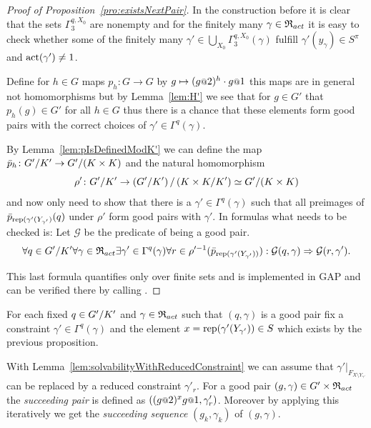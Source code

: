 \documentclass[a4paper,11pt]{amsart}
\begin{document}
\begin{proof}[Proof of Proposition~\ref{pro:existsNextPair}]
 In the construction before it is clear that the sets $\Gamma_3^{q,X_0}$ are nonempty and for the finitely many $\gamma\in \mathfrak{R}_{act}$ it is
 easy to check whether some of the finitely many $\gamma'\in\bigcup_{X_0}\Gamma_3^{q,X_0}(\gamma)$ fulfill $\gamma'(y_\gamma) \in S^\pi$ and $\operatorname{act}(\gamma')\neq 1$.
 
 
  Define for $h\in G$ maps $p_h\colon G\to G$ by $g\mapsto (g\at{2})^{h}\cdot g\at{1}$ this maps are in general not homomorphisms but 
  by Lemma~\ref{lem:H'} 
  we see that for $g\in G'$ that $p_h(g)\in G'$ for all $h\in G$ thus there is a chance that these elements form good pairs with
  the correct choices of $\gamma' \in \Gamma^q(\gamma)$. 
 
  By Lemma~\ref{lem:pIsDefinedModK'} we can define the map $\bar p_h\colon {G'/K'} \to {G'/(K\times K)}$
 and the natural homomorphism \[\rho'\colon {G'/K'} \to {\left({G'/K'}\right)/\left({K\times K/K'}\right)} \simeq {G'/(K\times K)} \]
 and now only need to show that there is a $\gamma'\in\Gamma^q(\gamma)$ such that all preimages of $\bar p_{\textup{rep}(\gamma'(Y_{\gamma'})}(q)$ under $\rho'$ 
 form good pairs with $\gamma'$. In formulas what needs to be checked is: Let $\mathcal{G}$ be the predicate of being a good pair. 
 \[\forall q\in{G'/K'}
      \forall \gamma\in\mathfrak{R}_{act} 
	 \exists \gamma'\in \Gamma^q(\gamma)
	    \forall r\in \rho'^{-1}(\bar p_{\textup{rep}(\gamma'(Y_{\gamma'}))}):
	      \mathcal{G}(q,\gamma) \Rightarrow \mathcal{G}(r,\gamma').\]
 
 This last formula quantifies only over finite sets and is implemented in GAP and can be verified there by calling . 
 \end{proof}

 \begin{defi}
 For each fixed $q\in{G'/K'}$ and $\gamma\in \mathfrak{R}_{act}$ such that $(q,\gamma)$ is a good pair
 fix a constraint $\gamma'\in\Gamma^q(\gamma)$ and the element $x=\textup{rep}(\gamma'(Y_{\gamma'}))\in S$ which exists by the previous proposition.
 
 With Lemma~\ref{lem:solvabilityWithReducedConstraint} we can assume that $\gamma'|_{F_{X\setminus Y_{\gamma'}}}$ can be replaced by a reduced constraint $\gamma'_r$. 
 For a good pair $(g,\gamma)\in G'\times\mathfrak{R}_{act}$ the \emph{succeeding pair} is defined as $\left((g\at{2})^xg\at{1},\gamma'_r\right)$.
 Moreover by applying this iteratively we get the \emph{succeeding sequence} $(g_k,\gamma_k)$ of $(g,\gamma)$.
 \end{defi}
 
\end{document}
